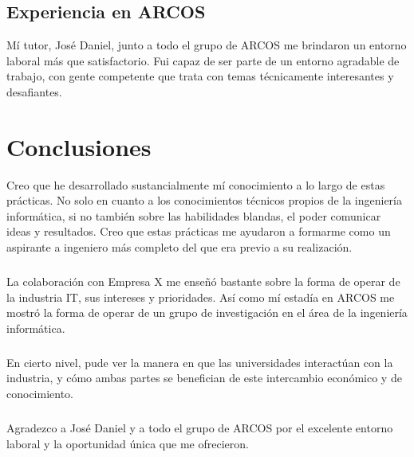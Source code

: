 \documentclass[12pt]{extreport} %
\begin{document}
\section{Experiencia en ARCOS}

Mí tutor, José Daniel, junto a todo el grupo de ARCOS me brindaron un
entorno laboral más que satisfactorio. Fui capaz de ser parte de un
entorno agradable de trabajo, con gente competente que trata con temas
técnicamente interesantes y desafiantes.

\chapter{Conclusiones}

Creo que he desarrollado sustancialmente mí conocimiento a lo largo de
estas prácticas. No solo en cuanto a los conocimientos técnicos
propios de la ingeniería informática, si no también sobre las
habilidades blandas, el poder comunicar ideas y resultados. Creo que
estas prácticas me ayudaron a formarme como un aspirante a ingeniero
más completo del que era previo a su realización.

\paragraph{}
La colaboración con Empresa X me enseñó bastante sobre la forma de
operar de la industria IT, sus intereses y prioridades. Así como mí
estadía en ARCOS me mostró la forma de operar de un grupo de
investigación en el área de la ingeniería informática.

\paragraph{}
En cierto nivel, pude ver la manera en que las universidades
interactúan con la industria, y cómo ambas partes se benefician de
este intercambio económico y de conocimiento.

\paragraph{}
Agradezco a José Daniel y a todo el grupo de ARCOS por el excelente
entorno laboral y la oportunidad única que me ofrecieron.
\end{document}
